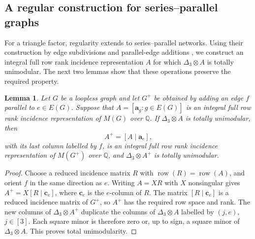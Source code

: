 \documentclass[12pt,a4paper]{article}
\numberwithin{equation}{section}
\DeclareMathOperator{\row}{row}
\newcommand{\QQ}{\mathbb Q}
\newtheorem{lemma}[lemma]{Lemma}
\theoremstyle{definition}
\theoremstyle{remark}
\begin{document}
\subsection{A regular construction for series--parallel graphs}
For a triangle factor, regularity extends to series--parallel
networks.  Using their construction by edge subdivisions and
parallel-edge additions \cite{duffin-series-parallel,brylawski-series-parallel},
we construct an integral full row rank incidence representation
\(A\) for which
\(\Delta_3\otimes A\) is totally unimodular.  The next two lemmas
show that these operations preserve the required property.

\begin{lemma}\label{lem:triangle-parallel-tu}
Let \(G\) be a loopless graph and let \(G^+\) be obtained by adding
an edge \(f\) parallel to \(e\in E(G)\).  Suppose that
\(A=[\boldsymbol a_g:g\in E(G)]\) is an integral full row rank
incidence representation of \(M(G)\) over \(\QQ\).  If
\(\Delta_3\otimes A\) is totally unimodular, then
\[
 A^+=[A\mid\boldsymbol a_e],
\]
with its last column labelled by \(f\), is an integral full row rank
incidence representation of \(M(G^+)\) over \(\QQ\), and
\(\Delta_3\otimes A^+\) is totally unimodular.
\end{lemma}
\begin{proof}
Choose a reduced incidence matrix \(R\) with
\(\row(R)=\row(A)\), and orient \(f\) in the same direction as
\(e\).  Writing \(A=XR\) with \(X\) nonsingular gives
\(A^+=X[R\mid\boldsymbol c_e]\), where
\(\boldsymbol c_e\) is the \(e\)-column of \(R\).
The matrix \([R\mid\boldsymbol c_e]\) is a reduced incidence
matrix of \(G^+\), so \(A^+\) has the required row space and rank.
The new columns of \(\Delta_3\otimes A^+\) duplicate the columns
of \(\Delta_3\otimes A\) labelled by \((j,e)\), \(j\in[3]\).
Each square minor is therefore zero or, up to sign, a square minor
of \(\Delta_3\otimes A\).  This proves total unimodularity.
\end{proof}
\end{document}
